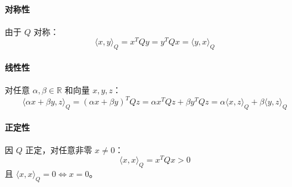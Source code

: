 \paragraph{对称性}  
由于 \(Q\) 对称：
\[
\langle x, y \rangle_Q = x^T Qy = y^T Qx = \langle y, x \rangle_Q
\]

\paragraph{线性性}  
对任意 \(\alpha, \beta \in \mathbb{R}\) 和向量 \(x, y, z\)：
\[
\langle \alpha x + \beta y, z \rangle_Q = (\alpha x + \beta y)^T Qz = \alpha x^T Qz + \beta y^T Qz = \alpha \langle x, z \rangle_Q + \beta \langle y, z \rangle_Q
\]

\paragraph{正定性}  
因 \(Q\) 正定，对任意非零 \(x \neq 0\)：
\[
\langle x, x \rangle_Q = x^T Qx > 0
\]
且 \(\langle x, x \rangle_Q = 0 \iff x = 0\)。